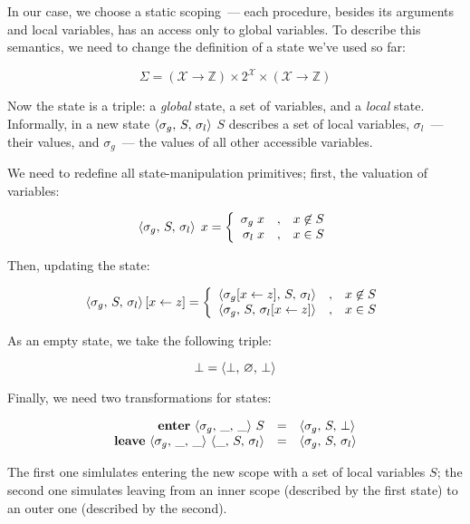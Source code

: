 In our case, we choose a static scoping~--- each procedure, besides its arguments and local variables, has an access
only to global variables.  To describe this semantics, we need to change the definition of a state we've used so far:

\[
\Sigma = (\mathscr X \to \mathbb Z) \times 2^{\mathscr X} \times (\mathscr X \to \mathbb Z)
\]

Now the state is a triple: a \emph{global} state, a set of variables, and a \emph{local} state. Informally, in a new
state $\left<{\sigma_g,\,S,\,\sigma_l}\right>$ $S$ describes a set of local variables, $\sigma_l$~--- their values, and $\sigma_g$~---
the values of all other accessible variables.

We need to redefine all state-manipulation primitives; first, the valuation of variables:

\[
\left<{\sigma_g,\,S,\,\sigma_l}\right>\;x=
  \left\{\begin{array}{rcl}
            \sigma_g\;x & , & x\not\in S\\
            \sigma_l\;x & , & x \in S
         \end{array}
  \right.
\]

Then, updating the state:

\[
\left<{\sigma_g,\,S,\,\sigma_l}\right>[x\gets z] =
  \left\{\begin{array}{rcl}
            \left<{\sigma_g[x\gets z],\,S,\,\sigma_l}\right> & , & x\not\in S\\
            \left<{\sigma_g,\,S,\,\sigma_l[x\gets z]}\right> & , & x \in S
         \end{array}
  \right.
\]

As an empty state, we take the following triple:

\[
\bot=\left<{\bot,\,\varnothing,\,\bot}\right>
\]

Finally, we need two transformations for states:

\[
\begin{array}{rcl}
  \mbox{\textbf{enter}}\,\left<{\sigma_g,\,\_,\,\_}\right>\,S & = & \left<{\sigma_g,\,S,\,\bot}\right>\\
  \mbox{\textbf{leave}}\,\left<{\sigma_g,\,\_,\,\_}\right>\,\left<{\_,\,S,\,\sigma_l}\right>& = & \left<{\sigma_g,\,S,\,\sigma_l}\right>
\end{array}
\]

The first one simlulates entering the new scope with a set of local variables $S$; the second one simulates leaving
from an inner scope (described by the first state) to an outer one (described by the second).

